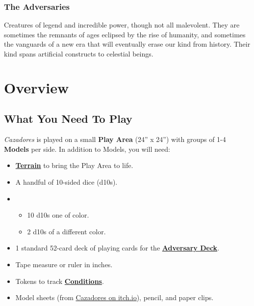 \documentclass[
]{book}
\providecommand{\tightlist}{%
  \setlength{\itemsep}{0pt}\setlength{\parskip}{0pt}}
\begin{document}
\hypertarget{the-adversaries}{%
\subsection*{The Adversaries}\label{the-adversaries}}

Creatures of legend and incredible power, though not all malevolent. They are sometimes the remnants of ages eclipsed by the rise of humanity, and sometimes the vanguards of a new era that will eventually erase our kind from history. Their kind spans artificial constructs to celestial beings.

\hypertarget{overview}{%
\chapter{Overview}\label{overview}}

\hypertarget{materials}{%
\section{What You Need To Play}\label{materials}}

\emph{Cazadores} is played on a small \textbf{Play Area} (24'' x 24'') with groups of 1-4 \textbf{Models} per side. In addition to Models, you will need:

\begin{itemize}
\item
  \textbf{\protect\hyperlink{terrain}{Terrain}} to bring the Play Area to life.
\item
  A handful of 10-sided dice (d10s).
\item
  \begin{itemize}
  \tightlist
  \item
    10 d10s one of color.
  \item
    2 d10s of a different color.
  \end{itemize}
\item
  1 standard 52-card deck of playing cards for the \textbf{\protect\hyperlink{adeck}{Adversary Deck}}.
\item
  Tape measure or ruler in inches.
\item
  Tokens to track \textbf{\protect\hyperlink{conditions}{Conditions}}.
\item
  Model sheets (from \href{https://matachingames.itch.io/cazadores}{Cazadores on itch.io}), pencil, and paper clips.
\end{itemize}
\end{document}
